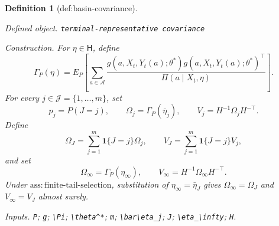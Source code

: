 \documentclass{article}
\newtheorem{definition}{Definition}
\begin{document}
\begin{definition}[def:basin-covariance]\label{def:basin-covariance}
\par\smallskip\noindent\emph{Defined object.} \texttt{terminal-\allowbreak{}representative covariance}
\par\smallskip\noindent\emph{Construction.} For \(\eta\in\mathsf H\), define
\[
 \Gamma_P(\eta)=E_P\!\left[\sum_{a\in\mathcal A}
 \frac{g(a,X_t,Y_t(a);\theta^*)g(a,X_t,Y_t(a);\theta^*)^\top}
 {\Pi(a\mid X_t,\eta)}\right].
\]
For every \(j\in\mathcal J=\{1,\ldots,m\}\), set
\[
 p_j=P(J=j),\qquad
 \Omega_j=\Gamma_P(\bar\eta_j),\qquad
 V_j=H^{-1}\Omega_jH^{-\top}.
\]
Define
\[
 \Omega_J=\sum_{j=1}^m\mathbf1\{J=j\}\Omega_j,\qquad
 V_J=\sum_{j=1}^m\mathbf1\{J=j\}V_j,
\]
and set
\[
 \Omega_\infty=\Gamma_P(\eta_\infty),\qquad
 V_\infty=H^{-1}\Omega_\infty H^{-\top}.
\]
Under \(\mathrm{ass:finite\text{-}tail\text{-}selection}\), substitution of \(\eta_\infty=\bar\eta_J\) gives \(\Omega_\infty=\Omega_J\) and \(V_\infty=V_J\) almost surely.
\par\smallskip\noindent\emph{Inputs.} \texttt{P}; \texttt{g}; \texttt{\textbackslash{}\allowbreak{}Pi}; \texttt{\textbackslash{}\allowbreak{}theta\textasciicircum{}*}; \texttt{m}; \texttt{\textbackslash{}\allowbreak{}bar\textbackslash{}\allowbreak{}eta\_\allowbreak{}j}; \texttt{J}; \texttt{\textbackslash{}\allowbreak{}eta\_\allowbreak{}\textbackslash{}\allowbreak{}infty}; \texttt{H}.
\end{definition}
\end{document}
